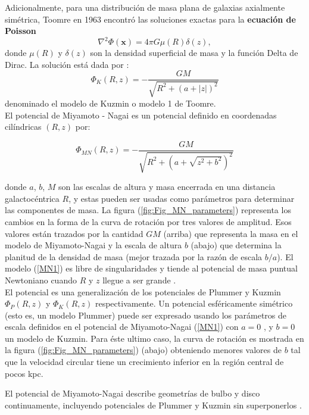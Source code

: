 Adicionalmente, para una distribución de masa plana de galaxias axialmente simétrica, Toomre en 1963 encontró las soluciones exactas para la \textbf{ecuación de Poisson}
$$\nabla^2 \Phi (\textbf{x}) = 4\pi  G \mu(R) \delta(z),$$
donde $\mu(R)$ y $\delta(z) $ son la densidad superficial de masa y la función Delta de Dirac. La solución está dada por \cite{Miyamoto75, BT}:
$$\Phi_K (R,z) = - \frac{GM}{\sqrt{R^2+(a+|z|)^2} }$$
denominado el modelo de Kuzmin o modelo 1 de Toomre.\\

El potencial de Miyamoto - Nagai es un potencial definido en coordenadas cilíndricas $(R,z)$ por:

\begin{equation}
\label{MN1}
\Phi_{MN} (R,z) = - \frac{GM}{\sqrt{R^2+(a+\sqrt{z^2+b^2})^2}}
\end{equation}

donde $a$, $b$, $M$ son las escalas de altura  y masa encerrada en una distancia galactocéntrica  $R$, y estas pueden ser usadas como parámetros para determinar las componentes de masa. La figura  (\ref{fig:Fig_MN_parameters}) representa los cambios en la forma de la curva de rotación por tres valores de amplitud. Esos valores están trazados por la cantidad $GM$ (arriba) que representa la masa en el modelo de Miyamoto-Nagai y la escala de altura $b$ (abajo) que determina la planitud de la densidad de masa (mejor trazada por la razón de escala $b/a$). El modelo (\ref{MN1}) es libre de singularidades y tiende al potencial de masa puntual Newtoniano cuando $R$ y $z$ llegue a ser grande \cite{Miyamoto75}.\\

El potencial es una generalización de los potenciales de Plummer y Kuzmin
$\Phi_P (R,z)$ y $\Phi_K (R,z)$ respectivamente. Un potencial esféricamente  simétrico (esto es, un modelo Plummer) puede ser expresado usando los parámetros de escala definidos en el potencial de Miyamoto-Nagai (\ref{MN1}) con $a=0$ \cite{Samurovic}, y $b=0$ un modelo de Kuzmin. Para éste ultimo caso, la curva de rotación es mostrada en la figura (\ref{fig:Fig_MN_parameters}) (abajo) obteniendo menores valores de $b$ tal que la velocidad circular tiene un crecimiento inferior en la región central de pocos kpc.

El potencial de  Miyamoto-Nagai describe geometrías de bulbo y disco continuamente, incluyendo potenciales de Plummer y Kuzmin sin superponerlos \cite{Miyamoto75}. 
 
